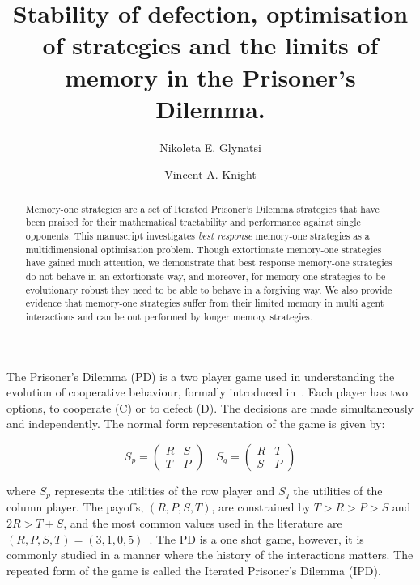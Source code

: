 \documentclass[10pt]{article}
\title{Stability of defection, optimisation of strategies and the limits of
       memory in the Prisoner's Dilemma.}
\author[1, *]{Nikoleta E. Glynatsi}
\author[1]{Vincent A. Knight}
\affil[1]{Cardiff University, School of Mathematics, Cardiff, United Kingdom}
\affil[*]{Corresponding author: Nikoleta E. Glynatsi, glynatsine@cardiff.ac.uk}
\date{}
\begin{document}
\maketitle

\newpage

\begin{abstract}
    Memory-one strategies are a set of Iterated Prisoner's Dilemma strategies
    that have been praised for their mathematical tractability and performance
    against single opponents. This manuscript investigates \textit{best
    response} memory-one strategies as a multidimensional
    optimisation problem. Though extortionate memory-one strategies have gained
    much attention, we demonstrate that best response memory-one strategies do not
    behave in an extortionate way, and moreover, for memory one strategies to be
    evolutionary robust they need to be able to behave in a forgiving way. We
    also provide evidence that memory-one strategies suffer from their limited
    memory in multi agent interactions and can be out performed by
    longer memory strategies.
\end{abstract}

The Prisoner's Dilemma (PD) is a two player game used in understanding the
evolution of cooperative behaviour, formally introduced in~\cite{Flood1958}.
Each player has two options, to cooperate (C) or to defect (D). The decisions
are made simultaneously and independently. The normal form representation of the
game is given by:

\begin{equation}\label{equ:pd_definition}
    S_p =
    \begin{pmatrix}
        R & S  \\
        T & P
    \end{pmatrix}
    \quad
    S_q =
    \begin{pmatrix}
        R & T  \\
        S & P
    \end{pmatrix}
\end{equation}

where \(S_p\) represents the utilities of the row player and \(S_q\) the
utilities of the column player. The payoffs, \((R, P, S, T)\), are constrained
by \(T > R > P > S\) and \(2R > T + S\), and the most common values used in the
literature are \((R, P, S, T) = (3, 1, 0, 5)\)~\cite{Axelrod1981}.
The PD is a one shot game, however, it is commonly studied in a manner where the
history of the interactions matters. The repeated form of the game is called the
Iterated Prisoner's Dilemma (IPD).
\end{document}
